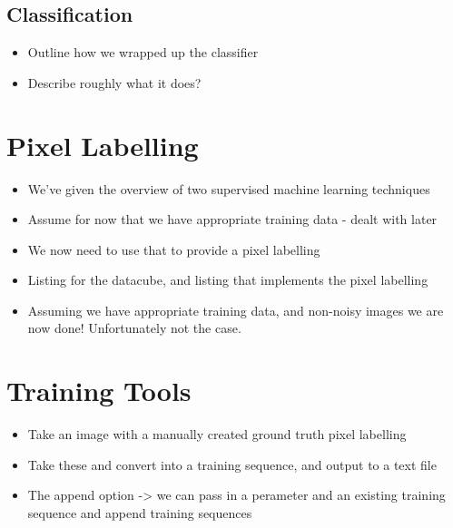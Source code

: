 \documentclass[12pt,twoside,notitlepage]{report}
\begin{document}
        \subsection{Classification}
            \begin{framed}
                \begin{itemize}
                    \item Outline how we wrapped up the classifier
                    \item Describe roughly what it does?
                \end{itemize}
            \end{framed}

    \section{Pixel Labelling} \label{sec:pixel_label}
        \begin{itemize}
            \item We've given the overview of two supervised machine learning techniques
            \item Assume for now that we have appropriate training data - dealt with later
            \item We now need to use that to provide a pixel labelling
            \item Listing for the datacube, and listing that implements the pixel labelling
            \item Assuming we have appropriate training data, and non-noisy images we are now done! Unfortunately not the case.
        \end{itemize}

    \section{Training Tools} \label{sec:training_tools}
        \begin{itemize}
            \item Take an image with a manually created ground truth pixel labelling
            \item Take these and convert into a training sequence, and output to a text file
            \item The append option -> we can pass in a perameter and an existing training sequence and append training sequences
        \end{itemize}
\end{document}
